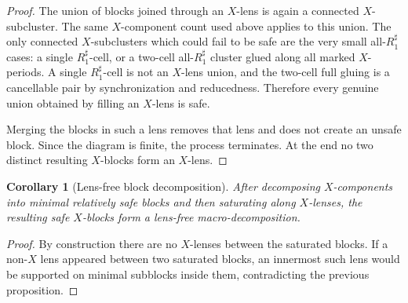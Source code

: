 \documentclass{article}
\newtheorem{lm}[theorem]{Lemma}
\newtheorem{cy}[theorem]{Corollary}
\begin{document}
\begin{proof}
The union of blocks joined through an $X$-lens is again a connected
$X$-subcluster.  The same $X$-component count used above applies to this
union.  The only connected $X$-subclusters which could fail to be safe are the
very small all-$R_1^{\sharp}$ cases: a single $R_1^{\sharp}$-cell, or a two-cell all-$R_1^{\sharp}$
cluster glued along all marked $X$-periods.  A single $R_1^{\sharp}$-cell is not an
$X$-lens union, and the two-cell full gluing is a cancellable pair by
synchronization and reducedness.  Therefore every genuine union obtained by
filling an $X$-lens is safe.

Merging the blocks in such a lens removes that lens and does not create an
unsafe block.  Since the diagram is finite, the process terminates.  At the
end no two distinct resulting $X$-blocks form an $X$-lens.
\end{proof}

\begin{cy}[Lens-free block decomposition]
After decomposing $X$-components into minimal relatively safe blocks and then
saturating along $X$-lenses, the resulting safe $X$-blocks form a lens-free
macro-decomposition.
\end{cy}

\begin{proof}
By construction there are no $X$-lenses between the saturated blocks.  If a
non-$X$ lens appeared between two saturated blocks, an innermost such lens
would be supported on minimal subblocks inside them, contradicting the
previous proposition.
\end{proof}



\end{document}
